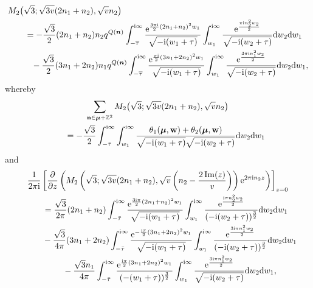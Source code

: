 \documentclass[10pt,a4paper]{amsart}
\def\BZ{\mathbb{Z}}
\theoremstyle{definition}
\numberwithin{equation}{section}
\begin{document}
\begin{align*}%
	&M_2\bigl(\sqrt{3};\sqrt{3v}(2n_1+n_2),\sqrt{v}n_2\bigr)\\
	&\qquad=-\frac{\sqrt{3}}{2}(2n_1+n_2)n_2q^{Q(\boldsymbol{n})}\int_{-\overline{\tau}}^{{\rm i} \infty}
	\frac{{\rm e}^{\frac{3\pi {\rm i}}{2}(2n_1+n_2)^2w_1}}{\sqrt{-{\rm i}(w_1+\tau)}}\int_{w_1}^{{\rm i} \infty}
	\frac{{\rm e}^{\frac{\pi {\rm i} n_2^2 w_2}{2}}}{\sqrt{-{\rm i}(w_2+\tau)}}{\rm d}w_2 {\rm d}w_1
	\\
	&\phantom{\qquad=}{}
	-\frac{\sqrt{3}}{2}(3n_1+2n_2)n_1q^{Q(\boldsymbol{n})} \int_{-\overline{\tau}}^{{\rm i} \infty}
	\frac{{\rm e}^{\frac{\pi {\rm i}}{2}(3n_1+2n_2)^2w_1}}{\sqrt{-{\rm i}(w_1+\tau)}}
	\int_{w_1}^{{\rm i} \infty}
	\frac{{\rm e}^{\frac{3\pi {\rm i} n_1^2 w_2}{2}}}{\sqrt{-{\rm i}(w_2+\tau)}}{\rm d}w_2 {\rm d}w_1,
\end{align*}
whereby
\begin{gather*}%
	\sum_{\mathbf{n} \in \boldsymbol{\mu} + \BZ^2}
	M_2\bigl(\sqrt{3};\sqrt{3v}(2n_1+n_2),\sqrt{v}n_2\bigr)
	\\
	\qquad= -\frac{\sqrt{3}}{2}\int_{-\bar{\tau}}^{{\rm i} \infty}
	\int_{w_1}^{{\rm i} \infty}\frac{\theta_1({\boldsymbol\mu},
		{\bf w})+\theta_2({\boldsymbol\mu},
		{\bf w})}{\sqrt{-{\rm i}(w_1+\tau)}\sqrt{-{\rm i}(w_2+\tau)}}{\rm d}w_2{\rm d}w_1
\end{gather*}
and
\begin{gather*}%
	\frac{1}{2\pi {\rm i}}\left[\frac{\partial}{\partial z}\left(M_2\left(\sqrt 3;\sqrt{3v}(2n_1+n_2),\sqrt{v}\left(n_2-\frac{2\operatorname{Im}(z)}{v}\right)\right){\rm e}^{2\pi {\rm i}n_2z}\right)\right]_{z=0}\\
	\qquad=\frac{\sqrt{3}}{2\pi}(2n_1+n_2)\int_{-\bar{\tau}}^{{\rm i}\infty} \frac{{\rm e}^{\frac{3{\rm i}\pi}{2}(2n_1+n_2)^2w_1}}{\sqrt{-{\rm i}(w_1+\tau)}}\int_{w_1}^{{\rm i}\infty} \frac{{\rm e}^{\frac{{\rm i}\pi n_2^2w_2}{2}}}{(-{\rm i}(w_2+\tau))^{\frac32}}{\rm d}w_2{\rm d}w_1\\
	\qquad\phantom{=}{}-\frac{\sqrt{3}}{4\pi}(3n_1+2n_2)\int_{-\bar{\tau}}^{{\rm i}\infty} \frac{{\rm e}^{-\frac{{\rm i}\pi}{2}(3n_1+2n_2)^2w_1}}{\sqrt{-{\rm i}(w_1+\tau)}}\int_{w_1}^{{\rm i}\infty} \frac{{\rm e}^{\frac{3{\rm i}\pi n_1^2w_2}{2}}}{(-{\rm i}(w_2+\tau))^{\frac32}}{\rm d}w_2{\rm d}w_1\\
	\qquad\phantom{=}{}-\frac{\sqrt{3}n_1}{4\pi}\int_{-\bar{\tau}}^{{\rm i}\infty} \frac{{\rm e}^{\frac{{\rm i}\pi}{2}(3n_1+2n_2)^2w_1}}{(-(w_1+\tau))^\frac32}\int_{w_1}^{{\rm i}\infty}\frac{{\rm e}^{\frac{3{\rm i}\pi n_1^2w_2}{2}}}{\sqrt{-{\rm i}(w_2+\tau)}}{\rm d}w_2{\rm d}w_1,
\end{gather*}
\end{document}
